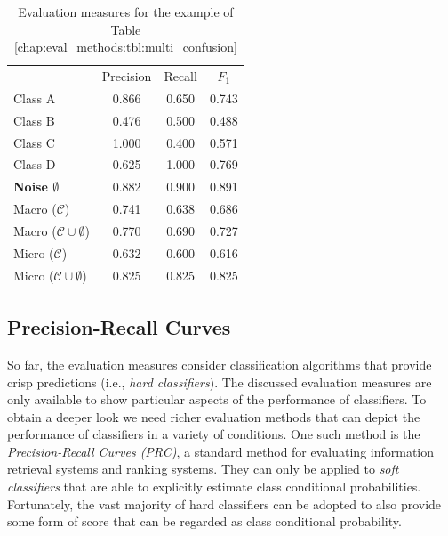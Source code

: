 \begin{table}[t]
	\center
	\caption{Evaluation measures for the example of Table \ref{chap:eval_methods:tbl:multi_confusion}}\label{chap:eval_methods:tbl:macro_vs_micro}
	\begin{tabular}{c c c c}
		\cline{2-4}
		& \multicolumn{1}{|c}{Precision} & \multicolumn{1}{c}{Recall} & \multicolumn{1}{c|}{$F_{1}$}\\
		\cline{1-4}
		\multicolumn{1}{|l}{Class A} & \multicolumn{1}{|c}{0.866} & \multicolumn{1}{c}{0.650} & \multicolumn{1}{c|}{0.743}\\
		\multicolumn{1}{|l}{Class B} & \multicolumn{1}{|c}{0.476} & \multicolumn{1}{c}{0.500} & \multicolumn{1}{c|}{0.488}\\
		\multicolumn{1}{|l}{Class C} & \multicolumn{1}{|c}{1.000} & \multicolumn{1}{c}{0.400} & \multicolumn{1}{c|}{0.571}\\
		\multicolumn{1}{|l}{Class D} & \multicolumn{1}{|c}{0.625} & \multicolumn{1}{c}{1.000} & \multicolumn{1}{c|}{0.769}\\
		\multicolumn{1}{|l}{\textbf{Noise $\emptyset$}} & \multicolumn{1}{|c}{0.882} & \multicolumn{1}{c}{0.900} & \multicolumn{1}{c|}{0.891}\\
		\cline{1-4}
		\multicolumn{1}{|l}{Macro ($\mathcal{C}$)} & \multicolumn{1}{|c}{0.741} & \multicolumn{1}{c}{0.638} & \multicolumn{1}{c|}{0.686}\\
		\multicolumn{1}{|l}{Macro ($\mathcal{C} \cup \emptyset$)} & \multicolumn{1}{|c}{0.770} & \multicolumn{1}{c}{0.690} & \multicolumn{1}{c|}{0.727}\\
		\multicolumn{1}{|l}{Micro ($\mathcal{C}$)} & \multicolumn{1}{|c}{0.632} & \multicolumn{1}{c}{0.600} & \multicolumn{1}{c|}{0.616}\\
		\multicolumn{1}{|l}{Micro ($\mathcal{C} \cup \emptyset$)} & \multicolumn{1}{|c}{0.825} & \multicolumn{1}{c}{0.825} & \multicolumn{1}{c|}{0.825}\\
		\cline{1-4}
	\end{tabular}
\end{table}

\subsection{Precision-Recall Curves}\label{chap:eval_methods:sec:roc_prc}

So far, the evaluation measures consider classification algorithms that provide crisp predictions (i.e., \textit{hard classifiers}). The discussed evaluation measures are only available to show particular aspects of the performance of classifiers. To obtain a deeper look we need richer evaluation methods that can depict the performance of classifiers in a variety of conditions. One such method is the \textit{Precision-Recall Curves (PRC)}, a standard method for evaluating information retrieval systems and ranking systems. They can only be applied to \textit{soft classifiers} that are able to explicitly estimate class conditional probabilities. Fortunately, the vast majority of hard classifiers can be adopted to also provide some form of score that can be regarded as class conditional probability.

